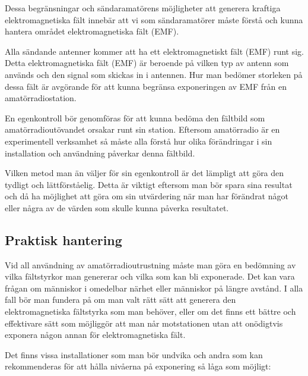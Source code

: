 Dessa begränsningar och sändaramatörens möjligheter att generera kraftiga
elektromagnetiska fält innebär att vi som sändaramatörer måste förstå
och kunna hantera området elektromagnetiska fält (EMF).

Alla sändande antenner kommer att ha ett elektromagnetiskt fält (EMF)
runt sig.
Detta elektromagnetiska fält (EMF) är beroende på vilken typ av antenn som
används och den signal som skickas in i antennen.
Hur man bedömer storleken på dessa fält är avgörande för att kunna
begränsa exponeringen av EMF från en amatörradiostation.

En egenkontroll bör genomföras för att kunna bedöma den fältbild som
amatörradioutövandet orsakar runt sin station.
Eftersom amatörradio är en experimentell verksamhet så måste alla förstå hur
olika förändringar i sin installation och användning påverkar denna fältbild.

Vilken metod man än väljer för sin egenkontroll är det lämpligt att
göra den tydligt och lättförståelig.
Detta är viktigt eftersom man bör spara sina resultat och då ha möjlighet att
göra om sin utvärdering när man har förändrat något eller några av de värden
som skulle kunna påverka resultatet.

\subsection{Praktisk hantering}
Vid all användning av amatörradioutrustning måste man göra en bedömning
av vilka fältstyrkor man genererar och vilka som kan bli exponerade.
Det kan vara frågan om människor i omedelbar närhet eller människor på
längre avstånd.
I alla fall bör man fundera på om man valt rätt sätt att generera den
elektromagnetiska fältstyrka som man behöver, eller om det finns ett bättre
och effektivare sätt som möjliggör att man når motstationen utan att onödigtvis
exponera någon annan för elektromagnetiska fält.

Det finns vissa installationer som man bör undvika och andra som kan
rekommenderas för att hålla nivåerna på exponering så låga som möjligt:

